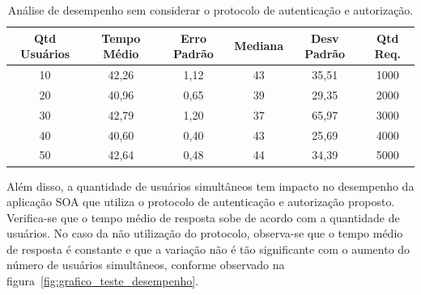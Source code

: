 \begin{table}[h]
\begin{center}
\begin{tabular}{|c|c|c|c|c|c|}
\hline
Qtd Usuários    & Tempo Médio    & Erro Padrão & Mediana  & Desv Padrão & Qtd Req. \\ \hline
10                                    & 42,26          & 1,12        & 43       & 35,51       &  1000       \\ \hline
20                                    & 40,96          & 0,65        & 39       & 29,35       &  2000       \\ \hline
30                                    & 42,79          & 1,20        & 37       & 65,97       &  3000       \\ \hline
40                                    & 40,60          & 0,40        & 43       & 25,69       &  4000       \\ \hline
50                                    & 42,64          & 0,48        & 44       & 34,39       &  5000       \\ \hline
\end{tabular}\caption {An\'{a}lise de desempenho sem considerar o protocolo de autenticação e autorização.}\label{tb:estatistica_sem_cripto}
\end{center}
\end{table}

Al\'{e}m disso, a quantidade de usuários simultâneos tem impacto no desempenho da aplicação SOA 
que utiliza o protocolo de autenticação e autorização proposto. Verifica-se que o tempo médio de resposta 
sobe de acordo com a quantidade de usuários. No caso da não utilização do protocolo, observa-se que o tempo médio 
de resposta é constante e que a variação não \'{e} tão significante com o aumento do número de usuários simultâneos,
 conforme observado na figura~\ref{fig:grafico_teste_desempenho}.

